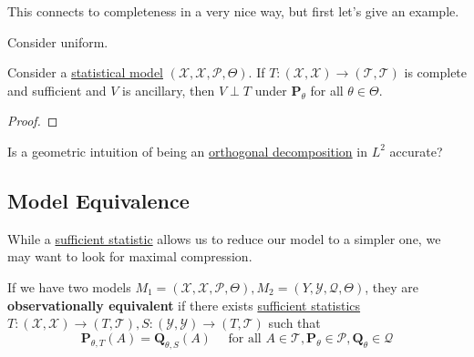   This connects to completeness in a very nice way, but first let's give an example. 

  \begin{example}
    \label{ex:sufficiency-for-the-uniform-model}
    Consider uniform. 
  \end{example}

  \begin{theorem}[Basu]
    \label{thm:basu}
    Consider a \hyperref[def:statistical-model]{statistical model} $(\mathcal{X}, \mathscr{X}, \mathcal{P}, \Theta)$. If $T: (\mathcal{X}, \mathscr{X}) \to (\mathcal{T}, \mathscr{T})$ is complete and sufficient and $V$ is ancillary, then $V \perp T$ under $\mathbf{P}_{\theta}$ for all $\theta \in \Theta$. 
  \end{theorem}
  \begin{proof}
    
  \end{proof}

  \begin{example}
    \label{ex:orthogonal-decomposition-in-l2}
    Is a geometric intuition of being an \hyperref[lin-thm:orthogonal-decomposition-theorem]{orthogonal decomposition} in $L^2$ accurate? 
  \end{example}

\subsection{Model Equivalence} 

  While a \hyperref[def:sufficient-statistic]{sufficient statistic} allows us to reduce our model to a simpler one, we may want to look for maximal compression. 

  \begin{definition}
    \label{def:observationally-equivalent}
    If we have two models $M_1 = (\mathcal{X}, \mathscr{X}, \mathcal{P}, \Theta), M_2 = (Y, \mathscr{Y}, \mathcal{Q}, \Theta)$, they are \textbf{observationally equivalent} if there exists \hyperref[def:sufficient-statistic]{sufficient statistics} $T: (\mathcal{X}, \mathscr{X}) \to (T, \mathcal{T}), S: (\mathcal{Y}, \mathscr{Y}) \to (T, \mathcal{T})$ such that 
    \begin{equation}
      \mathbf{P}_{\theta, T} (A) = \mathbf{Q}_{\theta, S} (A) \quad \text{ for all } A \in \mathcal{T}, \mathbf{P}_{\theta} \in \mathcal{P}, \mathbf{Q}_{\theta} \in \mathcal{Q}
    \end{equation}
  \end{definition} 

